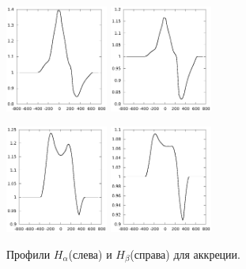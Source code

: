 \documentclass{article}
\begin{document}
\begin{figure}
	\includegraphics[width=0.3\textwidth]{profHa3accr603045}
	\includegraphics[width=0.3\textwidth]{profHb3accr603045}

	\includegraphics[width=0.3\textwidth]{profHa3accr903045}
	\includegraphics[width=0.3\textwidth]{profHb3accr903045}
	\caption{Профили $H_\alpha$(слева) и $H_\beta$(справа) для аккреции.}
\end{figure}
\end{document}
